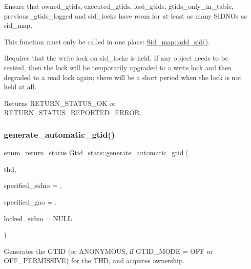 Ensure that owned\+\_\+gtids, executed\+\_\+gtids, lost\+\_\+gtids, gtids\+\_\+only\+\_\+in\+\_\+table, previous\+\_\+gtids\+\_\+logged and sid\+\_\+locks have room for at least as many S\+I\+D\+N\+Os as sid\+\_\+map.

This function must only be called in one place\+: \mbox{\hyperlink{classSid__map_a23aa9c0f385a44772e9e5c3955cca0cf}{Sid\+\_\+map\+::add\+\_\+sid()}}.

Requires that the write lock on sid\+\_\+locks is held. If any object needs to be resized, then the lock will be temporarily upgraded to a write lock and then degraded to a read lock again; there will be a short period when the lock is not held at all.

\begin{DoxyReturn}{Returns}
R\+E\+T\+U\+R\+N\+\_\+\+S\+T\+A\+T\+U\+S\+\_\+\+OK or R\+E\+T\+U\+R\+N\+\_\+\+S\+T\+A\+T\+U\+S\+\_\+\+R\+E\+P\+O\+R\+T\+E\+D\+\_\+\+E\+R\+R\+OR. 
\end{DoxyReturn}
\mbox{\label{classGtid__state_abdb617d2a570ff813a950b3aceefb22e}} 
\subsubsection{\texorpdfstring{generate\+\_\+automatic\+\_\+gtid()}{generate\_automatic\_gtid()}}
{\footnotesize\ttfamily enum\+\_\+return\+\_\+status Gtid\+\_\+state\+::generate\+\_\+automatic\+\_\+gtid (\begin{DoxyParamCaption}\item[{T\+HD $\ast$}]{thd,  }\item[{rpl\+\_\+sidno}]{specified\+\_\+sidno = {},  }\item[{rpl\+\_\+gno}]{specified\+\_\+gno = {},  }\item[{rpl\+\_\+sidno $\ast$}]{locked\+\_\+sidno = {\ttfamily NULL} }\end{DoxyParamCaption})}

Generates the G\+T\+ID (or A\+N\+O\+N\+Y\+M\+O\+US, if G\+T\+I\+D\+\_\+\+M\+O\+DE = O\+FF or O\+F\+F\+\_\+\+P\+E\+R\+M\+I\+S\+S\+I\+VE) for the T\+HD, and acquires ownership.


